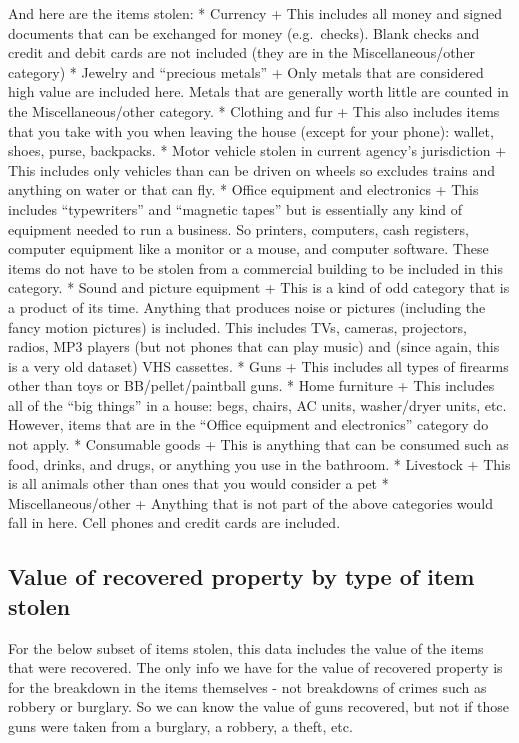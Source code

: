 \documentclass[
]{krantz}
\begin{document}
And here are the items stolen: * Currency + This includes
all money and signed documents that can be exchanged for
money (e.g.~checks). Blank checks and credit and debit cards
are not included (they are in the Miscellaneous/other
category) * Jewelry and ``precious metals'' + Only metals
that are considered high value are included here. Metals
that are generally worth little are counted in the
Miscellaneous/other category. * Clothing and fur + This also
includes items that you take with you when leaving the house
(except for your phone): wallet, shoes, purse, backpacks. *
Motor vehicle stolen in current agency's jurisdiction + This
includes only vehicles than can be driven on wheels so
excludes trains and anything on water or that can fly. *
Office equipment and electronics + This includes
``typewriters'' and ``magnetic tapes'' but is essentially
any kind of equipment needed to run a business. So printers,
computers, cash registers, computer equipment like a monitor
or a mouse, and computer software. These items do not have
to be stolen from a commercial building to be included in
this category. * Sound and picture equipment + This is a
kind of odd category that is a product of its time. Anything
that produces noise or pictures (including the fancy motion
pictures) is included. This includes TVs, cameras,
projectors, radios, MP3 players (but not phones that can
play music) and (since again, this is a very old dataset)
VHS cassettes. * Guns + This includes all types of firearms
other than toys or BB/pellet/paintball guns. * Home
furniture + This includes all of the ``big things'' in a
house: begs, chairs, AC units, washer/dryer units, etc.
However, items that are in the ``Office equipment and
electronics'' category do not apply. * Consumable goods +
This is anything that can be consumed such as food, drinks,
and drugs, or anything you use in the bathroom. * Livestock
+ This is all animals other than ones that you would
consider a pet * Miscellaneous/other + Anything that is not
part of the above categories would fall in here. Cell phones
and credit cards are included.

\subsection{Value of recovered property by type of item
stolen}\label{value-of-recovered-property-by-type-of-item-stolen}

For the below subset of items stolen, this data includes the
value of the items that were recovered. The only info we
have for the value of recovered property is for the
breakdown in the items themselves - not breakdowns of crimes
such as robbery or burglary. So we can know the value of
guns recovered, but not if those guns were taken from a
burglary, a robbery, a theft, etc.
\end{document}

